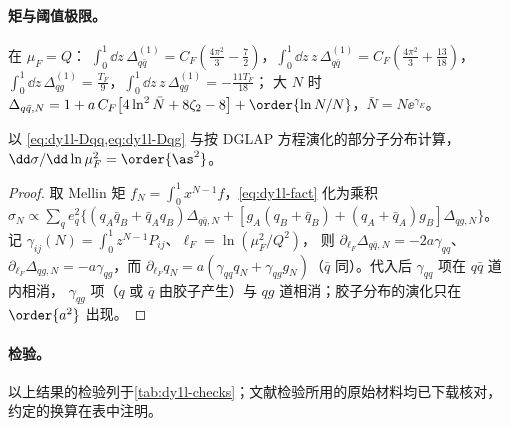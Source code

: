 \paragraph{矩与阈值极限。}在 $\mu_F=Q$：
$\int_0^1\dd z\,\Delta^{(1)}_{q\bar q}=C_F(\frac{4\pi^2}{3}-\frac72)$，$\int_0^1\dd z\,z\,\Delta^{(1)}_{q\bar q}=C_F(\frac{4\pi^2}{3}+\frac{13}{18})$，
$\int_0^1\dd z\,\Delta^{(1)}_{qg}=\frac{T_F}{9}$，$\int_0^1\dd z\,z\,\Delta^{(1)}_{qg}=-\frac{11T_F}{18}$；
大 $N$ 时 $\Delta_{q\bar q,N}=1+a\,C_F\big[4\ln^2\bar N+8\zeta_2-8\big]+\order{\ln N/N}$，$\bar N=N\ee^{\gamma_E}$。

\begin{proposition}\label{prop:dy1l-muF}
以 \cref{eq:dy1l-Dqq,eq:dy1l-Dqg} 与按 DGLAP 方程演化的部分子分布计算，
$\dd\sigma/\dd\ln\mu_F^2=\order{\as^2}$。
\end{proposition}

\begin{proof}
取 Mellin 矩 $f_N=\int_0^1x^{N-1}f$，\cref{eq:dy1l-fact} 化为乘积 $\sigma_N\propto\sum_qe_q^2\{(q_A\bar q_B+\bar q_Aq_B)\Delta_{q\bar q,N}
+[g_A(q_B+\bar q_B)+(q_A+\bar q_A)g_B]\Delta_{qg,N}\}$。记 $\gamma_{ij}(N)=\int_0^1z^{N-1}P_{ij}$、$\ell_F=\ln(\mu_F^2/Q^2)$，
则 $\partial_{\ell_F}\Delta_{q\bar q,N}=-2a\gamma_{qq}$、$\partial_{\ell_F}\Delta_{qg,N}=-a\gamma_{qg}$，而
$\partial_{\ell_F}q_N=a(\gamma_{qq}q_N+\gamma_{qg}g_N)$（$\bar q$ 同）。代入后 $\gamma_{qq}$ 项在 $q\bar q$ 道内相消，
$\gamma_{qg}$ 项（$q$ 或 $\bar q$ 由胶子产生）与 $qg$ 道相消；胶子分布的演化只在 $\order{a^2}$ 出现。
\end{proof}

\paragraph{检验。}以上结果的检验列于\cref{tab:dy1l-checks}；文献检验所用的原始材料均已下载核对，
约定的换算在表中注明。

